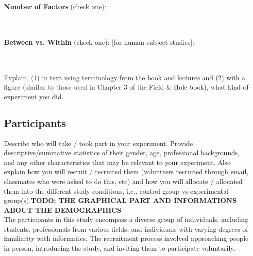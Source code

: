 \documentclass{article}
\begin{document}
\textbf{Number of Factors} (check one):\\
\noindent
\begin{minipage}{0.4\textwidth}
\end{minipage}%
\begin{minipage}{0.4\textwidth}
\end{minipage}%
\begin{minipage}{0.0\textwidth}
\end{minipage}\\\\

\textbf{Between vs. Within} (check one): [for human subject studies]:\\
\noindent
\begin{minipage}{0.5\textwidth}
\end{minipage}%
\begin{minipage}{0.47\textwidth}
\end{minipage}%
\begin{minipage}{0.0\textwidth}
\end{minipage}\\\\
Explain, (1) in text using terminology from the book and lectures and (2) with a figure (similar to those used in Chapter 3 of the Field \& Hole book), what kind of experiment you did.

\subsection{Participants}
Describe who will take / took part in your experiment. Provide descriptive/summative statistics of their gender, age, professional backgrounds, and any other characteristics that may be relevant to your experiment. Also explain how you will recruit / recruited them (volunteers recruited through email, classmates who were asked to do this, etc) and how you will allocate / allocated them into the different study conditions, i.e., control group vs experimental group(s).\textbf{TODO: THE GRAPHICAL PART AND INFORMATIONS ABOUT THE DEMOGRAPHICS}\\

The participants in this study encompass a diverse group of individuals, including students, professionals from various fields, and individuals with varying degrees of familiarity with informatics. The recruitment process involved approaching people in person, introducing the study, and inviting them to participate voluntarily.
\end{document}
